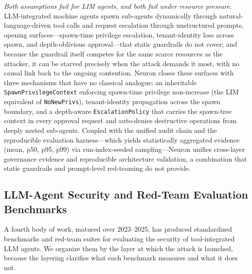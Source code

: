 \emph{Both assumptions fail for LIM agents, and both fail under resource
pressure.} LLM-integrated machine agents spawn sub-agents dynamically
through natural-language-driven tool calls and request escalation through
unstructured prompts, opening surfaces---spawn-time privilege escalation,
tenant-identity loss across spawn, and depth-oblivious approval---that
static guardrails do not cover; and because the guardrail itself competes
for the same scarce resources as the attacker, it can be starved precisely
when the attack demands it most, with no causal link back to the ongoing
contention. Neuron closes these surfaces with three mechanisms that have no
classical analogue: an inheritable \texttt{SpawnPrivilegeContext} enforcing
spawn-time privilege non-increase (the LIM equivalent of
\texttt{NoNewPrivs}), tenant-identity propagation across the spawn
boundary, and a depth-aware \texttt{EscalationPolicy} that carries the
spawn-tree context in every approval request and auto-denies destructive
operations from deeply nested sub-agents. Coupled with the unified audit
chain and the reproducible evaluation harness---which yields
statistically aggregated evidence (mean, p50, p95, p99) via
run-index-seeded sampling---Neuron unifies cross-layer governance
evidence and reproducible architecture validation, a combination that
static guardrails and prompt-level red-teaming do not provide.

\subsection{LLM-Agent Security and Red-Team Evaluation Benchmarks}
\label{sec:rw-eval}

A fourth body of work, matured over 2023--2025, has produced standardized
benchmarks and red-team suites for evaluating the security of tool-integrated
LLM agents. We organize them by the layer at which the attack is launched,
because the layering clarifies what each benchmark measures and what it does
not.

